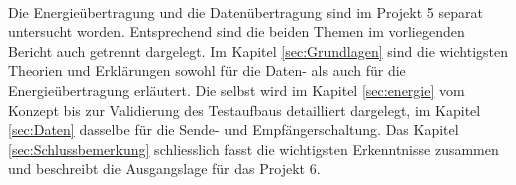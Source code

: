 \newline
\ \\ 
Die Energieübertragung und die Datenübertragung sind im Projekt 5 separat untersucht worden. Entsprechend sind die beiden Themen im vorliegenden Bericht auch getrennt dargelegt. Im Kapitel \ref{sec:Grundlagen}  sind die wichtigsten Theorien und Erklärungen sowohl für die Daten- als auch für die Energieübertragung erläutert. Die  selbst wird im Kapitel \ref{sec:energie} vom Konzept bis zur Validierung des Testaufbaus detailliert dargelegt, im Kapitel \ref{sec:Daten}  dasselbe für die Sende- und Empfängerschaltung. Das Kapitel \ref{sec:Schlussbemerkung}  schliesslich fasst die wichtigsten Erkenntnisse zusammen und beschreibt die Ausgangslage für das Projekt 6.



